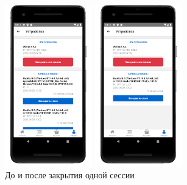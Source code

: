 \begin{figure}[!htb]\centering
    \begin{minipage}{0.19\textwidth}
        \centering

        \includegraphics[height=7cm]
        {images/mobile/sessions/sessions.png}
    \end{minipage}
    \begin{minipage}{0.19\textwidth}
        \centering

        \includegraphics[height=7cm]
        {images/mobile/sessions/sessions_close_one.png}
    \end{minipage}

    \caption{До и после закрытия одной сессии}
    \label{fig:test_sessions_close_one}
\end{figure}


